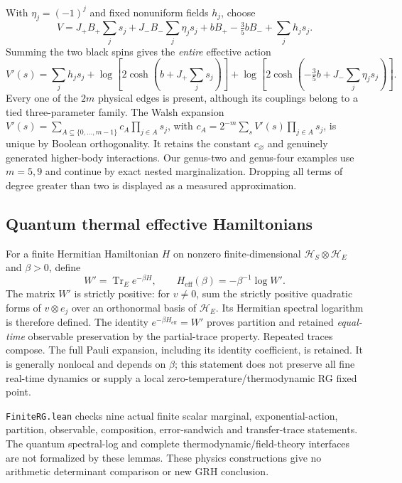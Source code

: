 \documentclass[11pt,oneside,openany]{book}
\theoremstyle{definition}\newtheorem{definition}[theorem]{Definition}
\theoremstyle{remark}\newtheorem{remark}[theorem]{Remark}
\begin{document}
With $\eta_j=(-1)^j $ and fixed nonuniform fields $ h_j $, choose
\[
 V=J_+B_+\sum_js_j+J_-B_-\sum_j\eta_js_j
       +bB_+-\tfrac 35 bB_-+\sum_jh_js_j.
\]
Summing the two black spins gives the \emph{entire} effective action
\[
 V'(s)=\sum_jh_js_j+
 \log\!\left[2\cosh\!\left(b+J_+\sum_js_j\right)\right]+
 \log\!\left[2\cosh\!\left(-\tfrac 35 b+J_-\sum_j\eta_js_j\right)\right].
\]
Every one of the $2 m $ physical edges is present, although its couplings
belong to a tied three-parameter family. The Walsh expansion
$ V'(s)=\sum_{A\subseteq\{0,\ldots,m-1\}}c_A\prod_{j\in A}s_j $,
with $ c_A=2^{-m}\sum_sV'(s)\prod_{j\in A}s_j $, is unique by Boolean
orthogonality. It retains the constant $ c_\varnothing $ and genuinely
generated higher-body interactions. Our genus-two and genus-four examples
use $ m=5,9$ and continue by exact nested marginalization. Dropping all terms
of degree greater than two is displayed as a measured approximation.

\subsection{Quantum thermal effective Hamiltonians}
For a finite Hermitian Hamiltonian $ H $ on nonzero finite-dimensional
$\mathcal H_S\otimes\mathcal H_E $
and $\beta>0$, define
\[
 W'=\operatorname{Tr}_E e^{-\beta H},\qquad
 H_{\mathrm{eff}}(\beta)=-\beta^{-1}\log W'.
\]
The matrix $ W'$ is strictly positive: for $ v\ne 0$, sum the strictly
positive quadratic forms of $ v\otimes e_j $ over an orthonormal basis of
$\mathcal H_E $. Its Hermitian spectral logarithm is therefore defined.
The identity $ e^{-\beta H_{\mathrm{eff}}}=W'$ proves partition and retained
\emph{equal-time} observable preservation by the partial-trace property.
Repeated traces compose. The full Pauli expansion, including its identity
coefficient, is retained. It is generally nonlocal and depends on $\beta $;
this statement does not preserve all fine real-time dynamics or supply a
local zero-temperature/thermodynamic RG fixed point.

\texttt{FiniteRG.lean} checks nine actual finite scalar marginal,
exponential-action, partition, observable, composition, error-sandwich and
transfer-trace statements. The quantum spectral-log and complete
thermodynamic/field-theory interfaces are not formalized by these lemmas.
These physics constructions give no arithmetic determinant comparison or
new GRH conclusion.
\end{document}
